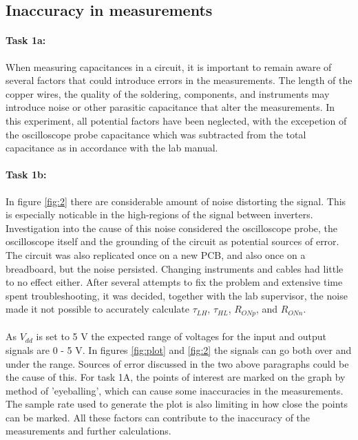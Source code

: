 \documentclass[onecolumn]{article}
\begin{document}
\subsection{Inaccuracy in measurements}
\paragraph{Task 1a:} 
When measuring capacitances in a circuit, it is important to remain aware of several factors that could introduce errors in the measurements. The length of the copper wires, the quality of the soldering, components, and instruments may introduce noise or other parasitic capacitance that alter the measurements. In this experiment, all potential factors have been neglected, with the excepetion of the oscilloscope probe capacitance which was subtracted from the total capacitance as in accordance with the lab manual.

\paragraph{Task 1b:} In figure \ref{fig:2} there are considerable amount of noise distorting the signal. This is especially noticable in the high-regions of the signal between inverters. Investigation into the cause of this noise considered the oscilloscope probe, the oscilloscope itself and the grounding of the circuit as potential sources of error. The circuit was also replicated once on a new PCB, and also once on a breadboard, but the noise persisted. Changing instruments and cables had little to no effect either. After several attempts to fix the problem and extensive time spent troubleshooting, it was decided, together with the lab supervisor, the noise made it not possible to accurately calculate $\tau_{LH}$, $\tau_{HL}$, $R_{ONp}$, and $R_{ONn}$. 

\paragraph{} As $V_{dd}$ is set to 5 V the expected range of voltages for the input and output signals are 0 - 5 V. In figures \ref{fig:plot} and \ref{fig:2} the signals can go both over and under the range. Sources of error discussed in the two above paragraphs could be the cause of this. For task 1A, the points of interest are marked on the graph by method of 'eyeballing', which can cause some inaccuracies in the measurements. The sample rate used to generate the plot is also limiting in how close the points can be marked. All these factors can contribute to the inaccuracy of the measurements and further calculations. 
\end{document}
